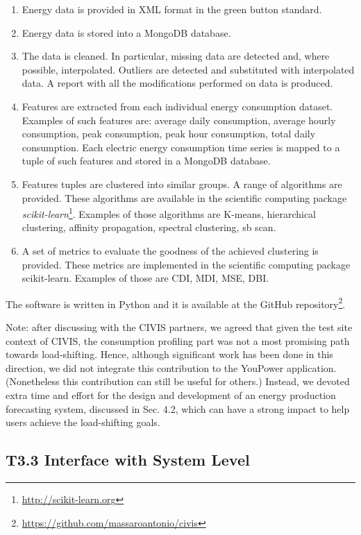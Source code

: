 \begin{enumerate} 
\item Energy data is provided in XML format in the green button standard.
\item Energy data is stored into a MongoDB database.
\item The data is cleaned. In particular, missing data are detected and, where possible, interpolated. Outliers are detected and substituted with interpolated data. A report with all the modifications performed on
data is produced. 
\item Features are extracted from each individual energy consumption dataset. Examples of such
features are: average daily consumption, average hourly consumption, peak consumption, peak hour
consumption, total daily consumption. Each electric energy consumption time series is mapped to a
tuple of such features and stored in a MongoDB database.
\item Features tuples are clustered into similar groups. A range of algorithms are provided. These
algorithms are available in the scientific computing package \textit{scikit-learn}\footnote{\url{http://scikit-learn.org}}. Examples of those algorithms are K-means,
hierarchical clustering, affinity propagation, spectral clustering, sb scan.
\item A set of metrics to evaluate the goodness of the achieved clustering is provided. These metrics are implemented in the scientific computing package scikit-learn. Examples of those are CDI, MDI,
MSE, DBI.
\end{enumerate}

The software is written in Python and it is available at the GitHub repository\footnote{\url{https://github.com/massaroantonio/civis}}.

Note: after discussing with the CIVIS partners, we agreed that given the test site context of CIVIS, the consumption profiling part was not a most promising path towards load-shifting. Hence, although significant work has been done in this direction, we did not integrate this contribution to the YouPower application. (Nonetheless this contribution can still be useful for others.)
Instead, we devoted extra time and effort for the design and development of an energy production forecasting
system, discussed in Sec. 4.2, which can have a strong impact to help users achieve the load-shifting goals.

\subsection{T3.3 Interface with System Level}

